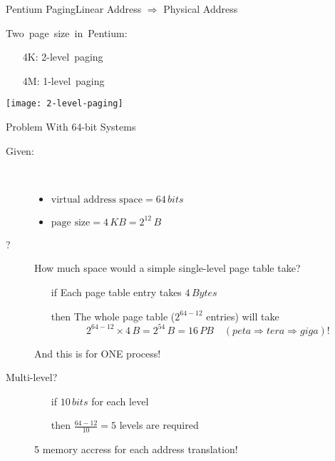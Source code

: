 \begin{frame}{Pentium Paging}{Linear Address $\Rightarrow$ Physical Address}
  \begin{minipage}{.4\textwidth}
    \mbox{Two page size in Pentium:}
    \begin{small}
      \begin{itemize}
      \item[4K:] \mbox{2-level paging}%
      \item[4M:] \mbox{1-level paging}%
      \end{itemize}
    \end{small}
    \begin{center}
      \texttt{[image: 2-level-paging]}
    \end{center}
  \end{minipage}\quad
  \begin{minipage}{.5\textwidth}
    \begin{center}
    \end{center}
  \end{minipage}
\end{frame}

\begin{frame}{Problem With 64-bit Systems}
  \begin{description}
  \item[Given:]\hfill\\[-2ex]
    \begin{itemize}
    \item $\text{virtual address space} = 64\,bits$
    \item $\text{page size}=4\,KB=2^{12}\,B$
    \end{itemize}
  \item[?] How much space would a simple single-level page table take?
    \begin{itemize}
    \item[if] Each page table entry takes $4\,Bytes$
    \item[then] The whole page table ($2^{64-12}$ entries) will take
      \[2^{64-12}\times{}4\,B=2^{54}\,B=16\,PB \quad {\scriptstyle(peta \Rightarrow tera \Rightarrow giga)!}\]
    \end{itemize}
    And this is for ONE process!
  \item[Multi-level?]\hfill
    \begin{itemize}
    \item[if] $10\,bits$ for each level
    \item[then] $\frac{64-12}{10}=5$ levels are required
    \end{itemize}
    5 memory accress for each address translation!
  \end{description}
\end{frame}

